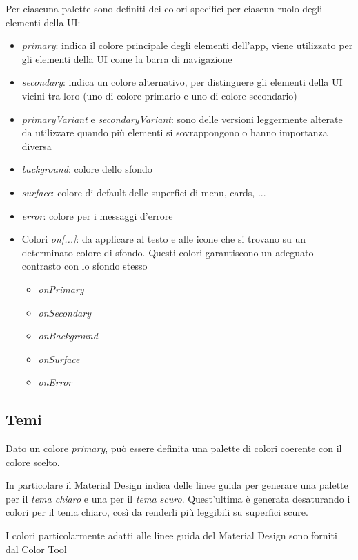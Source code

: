 \documentclass[12pt, a4paper]{report}
\begin{document}
	Per ciascuna palette sono definiti dei colori specifici per ciascun ruolo degli elementi della UI:
	\begin{itemize}
		\item \textit{primary}: indica il colore principale degli elementi dell'app, viene utilizzato per gli elementi della UI come la barra di navigazione
		\item \textit{secondary}: indica un colore alternativo, per distinguere gli elementi della UI vicini tra loro (uno di colore primario e uno di colore secondario)
		\item \textit{primaryVariant} e \textit{secondaryVariant}: sono delle versioni leggermente alterate da utilizzare quando più elementi si sovrappongono o hanno importanza diversa
		\item \textit{background}: colore dello sfondo
		\item \textit{surface}: colore di default delle superfici di menu, cards, ...
		\item \textit{error}: colore per i messaggi d'errore
		\item Colori \textit{on[...]}: da applicare al testo e alle icone che si trovano su un determinato colore di sfondo. Questi colori garantiscono un adeguato contrasto con lo sfondo stesso
		\begin{itemize}
			\item \textit{onPrimary}
			\item \textit{onSecondary}
			\item \textit{onBackground}
			\item \textit{onSurface}
			\item \textit{onError}
		\end{itemize}
	\end{itemize}
	
		\subsection{Temi}
		Dato un colore \textit{primary}, può essere definita una palette di colori coerente con il colore scelto.
		
		In particolare il Material Design indica delle linee guida per generare una palette per il \textit{tema chiaro} e una per il \textit{tema scuro}. Quest'ultima è generata desaturando i colori per il tema chiaro, così da renderli più leggibili su superfici scure.

		I colori particolarmente adatti alle linee guida del Material Design sono forniti dal \href{https://material.io/resources/color/#!/?view.left=0&view.right=0&primary.color=6002ee}{Color Tool} \cite{color_tool}
\end{document}
